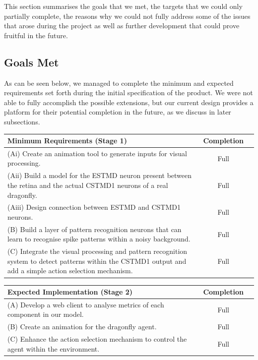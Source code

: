 \documentclass[a4paper,11pt]{article}
\begin{document}
This section summarises the goals that we met, the targets that we could only partially complete,
the reasons why we could not fully address some of the issues that arose during the project as well
as further development that could prove fruitful in the future.

\subsection{Goals Met}

As can be seen below, we managed to complete the minimum and expected requirements set forth during the initial specification of the product. We were not able to fully accomplish the possible extensions, but our current design 
provides a platform for their potential completion in the future, as we discuss in later subsections. 

\begin{center}
    \begin{tabular}{p{12cm} c c}
    \textbf{Minimum Requirements (Stage 1)} & \textbf{Completion} \\ \hline
    (Ai) Create an animation tool to generate inputs for visual processing. & Full \\ 
	(Aii) Build a model for the ESTMD neuron present between the retina and the actual CSTMD1 neurons of a real dragonfly. & Full \\
	(Aiii) Design connection between ESTMD and CSTMD1 neurons. & Full \\
	(B) Build a layer of pattern recognition neurons that can learn to recognise spike patterns within a noisy background. & Full\\
	(C) Integrate the visual processing and pattern recognition system to detect patterns within the CSTMD1 output and add a simple action selection mechanism. & Full\\
    \end{tabular}
\end{center}

\begin{center}
    \begin{tabular}{p{12cm} c c}
    \textbf{Expected Implementation (Stage 2)} & \textbf{Completion} \\ \hline
	(A) Develop a web client to analyse metrics of each component in our model. & Full \\
	(B) Create an animation for the dragonfly agent. & Full\\
	(C) Enhance the action selection mechanism to control the agent within the environment. & Full\\
    \end{tabular}
\end{center}
\end{document}
